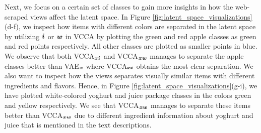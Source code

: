 Next, we focus on a certain set of classes to gain more insights in how the web-scraped views affect the latent space. 
In Figure \ref{fig:latent_space_visualizations}(d-f), we inspect how items with different colors are separated in the latent space by utilizing ${\bm{i}}$ or ${\bm{w}}$ in VCCA by plotting the green and red apple classes as green and red points respectively. All other classes are plotted as smaller points in blue. We observe that both VCCA$_{{\bm{x}} {\bm{i}}}$ and VCCA$_{{\bm{x}} {\bm{w}}}$ manages to separate the apple classes better than VAE$_{{\bm{x}}}$ where VCCA$_{{\bm{x}} {\bm{i}}}$ obtains the most clear separation.
We also want to inspect how the views separates visually similar items with different ingredients and flavors. Hence, in Figure \ref{fig:latent_space_visualizations}(g-i), we have plotted  white-colored yoghurt and juice package classes in the colors green and yellow respectively. 
We see that VCCA$_{{\bm{x}} {\bm{w}}}$ manages to separate these items better than VCCA$_{{\bm{x}} {\bm{w}}}$ due to different ingredient information about yoghurt and juice that is mentioned in the text descriptions. 



